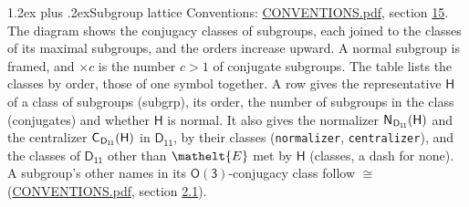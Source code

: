 \documentclass[10pt,a4paper]{article}
\makeatletter
\renewcommand\section{\@startsection{section}{1}{\z@}{-3ex plus -1ex minus -.2ex}%
  {1.2ex plus .2ex}{\normalfont\large\sffamily\bfseries\color{parttitle}}}
\numberwithin{equation}{section}
\newcommand{\eltfont}[1]{{\let\sigma\eltsigma\mathelt{#1}}}
\newcommand{\grp}[1]{\mathsf{#1}}
\newcommand{\cls}[1]{\eltfont{#1}}
\newcommand{\samecls}{\cong}
\newcommand{\nconj}[1]{{\scriptsize$\times#1$}}
\newcommand{\hairsp}{\mkern1mu}
\makeatother
\begin{document}
\section{Subgroup lattice}\label{s:subgroups}
Conventions: \href{../../CONVENTIONS.pdf}{CONVENTIONS.pdf}, section \href{../../CONVENTIONS.pdf\#conv.15}{15}.
The diagram shows the conjugacy classes of subgroups, each joined to the classes of its maximal subgroups, and the orders increase upward. A normal subgroup is framed, and ${\times}c$ is the number $c > 1$ of conjugate subgroups. The table lists the classes by order, those of one symbol together. \label{n:group.H}\label{n:head.subgroup}\label{n:head.order}\label{n:head.conjugates}\label{n:head.normal}A row gives the representative $\grp{H}$ of a class of subgroups (subgrp), its order, the number of subgroups in the class (conjugates) and whether $\grp{H}$ is normal. \label{n:group.normalizer}\label{n:group.centralizer}\label{n:head.classes}It also gives the normalizer $\grp{N}_{\hairsp \grp{D_{11}}}(\grp{H})$ and the centralizer $\grp{C}_{\hairsp \grp{D_{11}}}(\grp{H})$ in $\grp{D_{11}}$, by their classes (\texttt{normalizer}, \texttt{centralizer}), and the classes of $\grp{D_{11}}$ other than $\cls{E}$ met by $\grp{H}$ (classes, a dash for none). A subgroup's other names in its \href{O3.pdf}{$\grp{O(3)}$}-conjugacy class follow $\samecls$ (\href{../../CONVENTIONS.pdf}{CONVENTIONS.pdf}, section \href{../../CONVENTIONS.pdf\#conv.2.1}{2.1}).
\begin{center}
\end{center}
\end{document}

